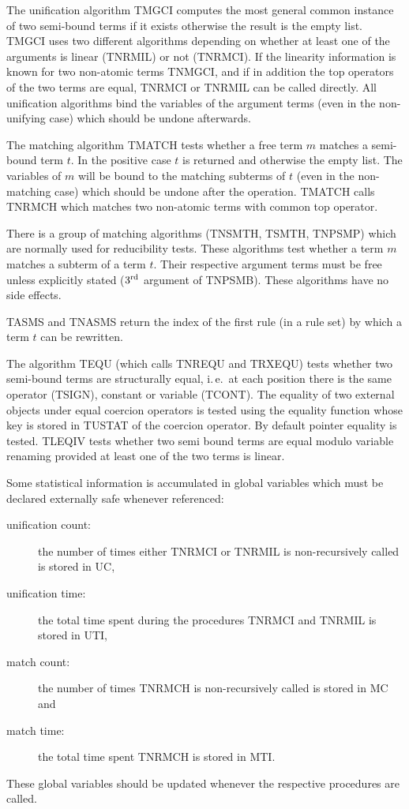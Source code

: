 The unification algorithm TMGCI computes the most general common instance of
two semi-bound terms if it exists otherwise the result is the empty list.
TMGCI uses two different algorithms depending on whether at least one of the
arguments is linear (TNRMIL) or not (TNRMCI).
If the linearity information is known for two non-atomic terms TNMGCI,
and if in addition the top operators of the two terms are equal,
TNRMCI or TNRMIL can be called directly.
All unification algorithms bind the variables of the argument terms
(even in the non-unifying case) which should be undone afterwards.

The matching algorithm TMATCH tests whether a free term $m$ matches a
semi-bound term $t$.
In the positive case $t$ is returned and otherwise the empty list.
The variables of $m$ will be bound to the matching subterms of $t$
(even in the non-matching case) which should be undone after the operation.
TMATCH calls TNRMCH which matches two non-atomic terms with common top
operator.

There is a group of matching algorithms (TNSMTH, TSMTH, TNPSMP) which
are normally used for reducibility tests.
These algorithms test whether a term $m$ matches a subterm of a term $t$.
Their respective argument terms must be free unless explicitly stated
($3^{\mbox{\scriptsize rd}}$ argument of TNPSMB).
These algorithms have no side effects.

TASMS and TNASMS return the index of  the first rule (in a rule set) by which a
term $t$ can be rewritten.

The algorithm TEQU (which calls TNREQU and TRXEQU) 
tests whether two semi-bound terms
are structurally equal, i.\,e.\ at each position there is the same operator
(TSIGN), constant or variable (TCONT).
The equality of two external objects under equal coercion operators
is tested using the equality function whose key is
stored in TUSTAT of the coercion operator. 
By default pointer equality is tested. 
TLEQIV tests whether two semi bound terms are equal modulo variable renaming
provided at least one of the two terms is linear.

Some statistical information is accumulated in global variables which must be
declared externally safe whenever referenced:
\begin{description}
 \item[unification count:] the number of times either TNRMCI or TNRMIL is
  non-recursively called is stored in UC,
 \item[unification time:] the total time spent during the procedures
  TNRMCI and TNRMIL is stored in UTI,
 \item[match count:] the number of times TNRMCH is
   non-recursively called is stored in MC and
 \item[match time:] the total time spent TNRMCH is stored in MTI.
\end{description}
These global variables should be updated whenever the respective procedures are
called.

